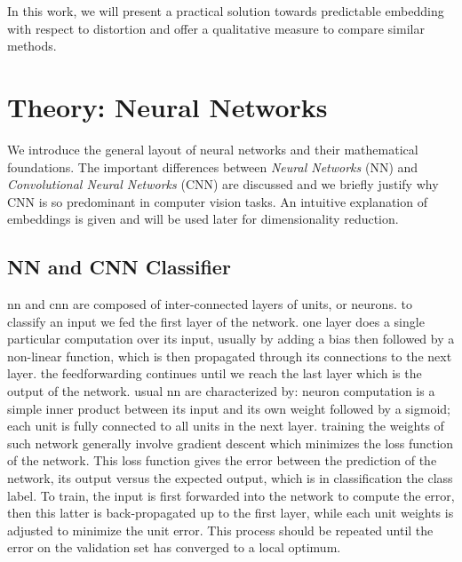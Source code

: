 \documentclass[a4paper,12pt]{report}
\begin{document}
In this work, we will present a practical solution towards predictable embedding with respect to distortion and offer a qualitative measure to compare similar methods. %


\chapter{Theory: Neural Networks}
We introduce the general layout of neural networks and their mathematical foundations.
The important differences between {\em Neural Networks} (NN) and {\em Convolutional Neural Networks} (CNN) are discussed and we briefly justify why CNN is so predominant in computer vision tasks.
An intuitive explanation of embeddings is given and will be used later for dimensionality reduction.

\section{NN and CNN Classifier}

nn and cnn are composed of inter-connected layers of units, or neurons.
to classify an input we fed the first layer of the network.
one layer does a single particular computation over its input, usually by adding a bias then followed by a non-linear function, which is then propagated through its connections to the next layer.
the feedforwarding continues until we reach the last layer which is the output of the network.
usual nn are characterized by: neuron computation is a simple inner product between its input and its own weight followed by a sigmoid; each unit is fully connected to all units in the next layer.
training the weights of such network generally involve gradient descent which minimizes the loss function of the network.
This loss function gives the error between the prediction of the network, its output versus the expected output, which is in classification the class label.
To train, the input is first forwarded into the network to compute the error, then this latter is back-propagated up to the first layer, while each unit weights is adjusted to minimize the unit error.
This process should be repeated until the error on the validation set has converged to a local optimum.
\end{document}

